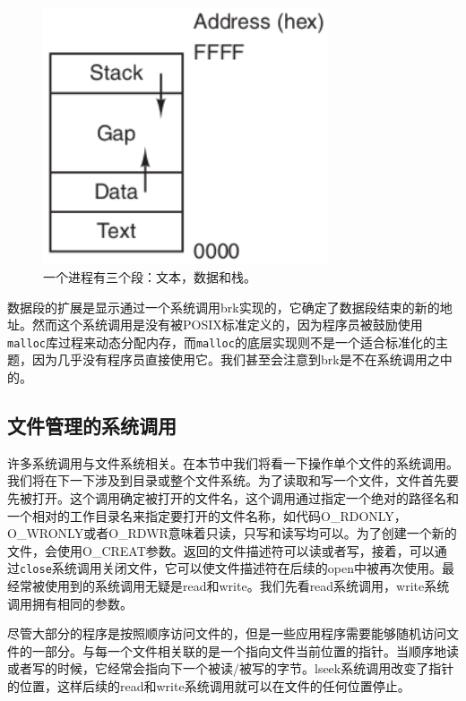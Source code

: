 	\begin{figure}[ht]\small
		\centering
		\includegraphics[width=0.75\textwidth]{FIG/1-20.png}
		\caption{一个进程有三个段：文本，数据和栈。}\label{fig:threesegments}
	\end{figure}
	
	数据段的扩展是显示通过一个系统调用brk实现的，它确定了数据段结束的新的地址。然而这个系统调用是没有被POSIX标准定义的，因为程序员被鼓励使用\texttt{malloc}库过程来动态分配内存，而\texttt{malloc}的底层实现则不是一个适合标准化的主题，因为几乎没有程序员直接使用它。我们甚至会注意到brk是不在系统调用之中的。
	
	\subsection{文件管理的系统调用}
	
	许多系统调用与文件系统相关。在本节中我们将看一下操作单个文件的系统调用。我们将在下一下涉及到目录或整个文件系统。为了读取和写一个文件，文件首先要先被打开。这个调用确定被打开的文件名，这个调用通过指定一个绝对的路径名和一个相对的工作目录名来指定要打开的文件名称，如代码O\_RDONLY，O\_WRONLY或者O\_RDWR意味着只读，只写和读写均可以。为了创建一个新的文件，会使用O\_CREAT参数。返回的文件描述符可以读或者写，接着，可以通过\texttt{close}系统调用关闭文件，它可以使文件描述符在后续的open中被再次使用。最经常被使用到的系统调用无疑是read和write。我们先看read系统调用，write系统调用拥有相同的参数。
	
	尽管大部分的程序是按照顺序访问文件的，但是一些应用程序需要能够随机访问文件的一部分。与每一个文件相关联的是一个指向文件当前位置的指针。当顺序地读或者写的时候，它经常会指向下一个被读/被写的字节。lseek系统调用改变了指针的位置，这样后续的read和write系统调用就可以在文件的任何位置停止。
	
